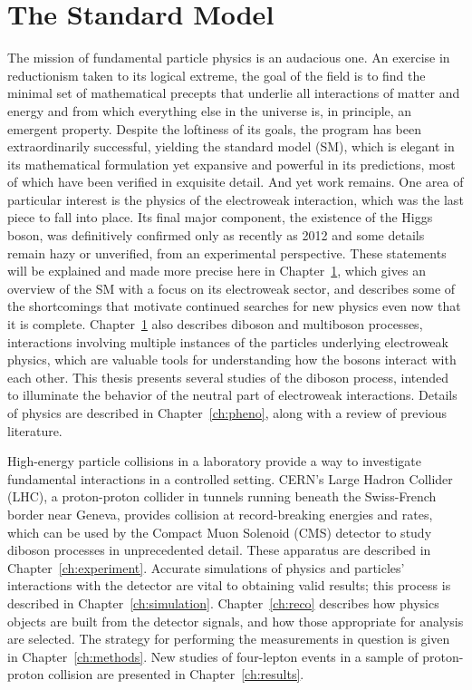 

\chapter{The Standard Model}\label{ch:SM}

The mission of fundamental particle physics is an audacious one.
An exercise in reductionism taken to its logical extreme, the goal of the field is to find the minimal set of mathematical precepts that underlie all interactions of matter and energy and from which everything else in the universe is, in principle, an emergent property.
Despite the loftiness of its goals, the program has been extraordinarily successful, yielding the standard model (SM), which is elegant in its mathematical formulation yet expansive and powerful in its predictions, most of which have been verified in exquisite detail.
And yet work remains.
One area of particular interest is the physics of the electroweak interaction, which was the last piece to fall into place.
Its final major component, the existence of the Higgs boson, was definitively confirmed only as recently as 2012 and some details remain hazy or unverified, from an experimental perspective.
These statements will be explained and made more precise here in Chapter~\ref{ch:SM}, which gives an overview of the SM with a focus on its electroweak sector, and describes some of the shortcomings that motivate continued searches for new physics even now that it is complete.
Chapter~\ref{ch:SM} also describes diboson and multiboson processes, interactions involving multiple instances of the particles underlying electroweak physics, which are valuable tools for understanding how the bosons interact with each other.
This thesis presents several studies of the {\ZZ} diboson process, intended to illuminate the behavior of the neutral part of electroweak interactions.
Details of {\ZZ} physics are described in Chapter~\ref{ch:pheno}, along with a review of previous literature.

High-energy particle collisions in a laboratory provide a way to investigate fundamental interactions in a controlled setting.
CERN's Large Hadron Collider (LHC), a proton-proton collider in tunnels running beneath the Swiss-French border near Geneva, provides collision at record-breaking energies and rates, which can be used by the Compact Muon Solenoid (CMS) detector to study diboson processes in unprecedented detail.
These apparatus are described in Chapter~\ref{ch:experiment}.
Accurate simulations of physics and particles' interactions with the detector are vital to obtaining valid results; this process is described in Chapter~\ref{ch:simulation}.
Chapter~\ref{ch:reco} describes how physics objects are built from the detector signals, and how those appropriate for analysis are selected.
The strategy for performing the {\ZZ} measurements in question is given in Chapter~\ref{ch:methods}.
New studies of four-lepton events in a sample of proton-proton collision are presented in Chapter~\ref{ch:results}.



